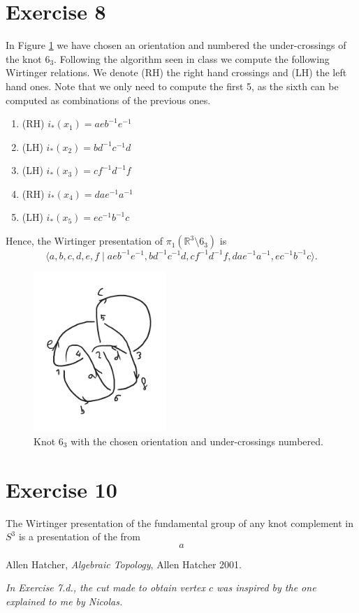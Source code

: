 \documentclass[11pt,a4paper]{article}
\newcommand{\R}{\mathbb R}
\begin{document}
\section*{Exercise 8}
In Figure \ref{fig:63} we have chosen an orientation and numbered the under-crossings of the knot $ 6_3 $. Following the algorithm seen in class we compute the following Wirtinger relations. We denote (RH) the right hand crossings and (LH) the left hand ones. Note that we only need to compute the first 5, as the sixth can be computed as combinations of the previous ones.
\renewcommand{\theenumi}{\arabic{enumi}} 
\begin{enumerate}
  \item (RH) $ i_*(x_1) = a e b^{-1} e^{-1} $
  \item (LH) $ i_*(x_2) = b d^{-1} c^{-1} d $
  \item (LH) $ i_*(x_3) = c f^{-1} d^{-1} f $
  \item (RH) $ i_*(x_4) = d a e^{-1} a^{-1} $
  \item (LH) $ i_*(x_5) = e c^{-1} b^{-1} c $
\end{enumerate}
Hence, the Wirtinger presentation of $ \pi_1 (\R^3 \setminus 6_3) $ is
$$
  \langle a, b, c, d, e, f \mid a e b^{-1} e^{-1}, b d^{-1} c^{-1} d, c f^{-1} d^{-1} f, d a e^{-1} a^{-1}, e c^{-1} b^{-1} c\rangle.
$$
\begin{figure}[h]
  \centering
  \includegraphics[width=5cm]{63.pdf}
  \caption{Knot $6_3$ with the chosen orientation and under-crossings numbered.}
  \label{fig:63}
\end{figure}

\section*{Exercise 10}
The Wirtinger presentation of the fundamental group of any knot complement in $ S^3$ is a presentation of the from
$$
  a
$$

\begin{thebibliography}{9}

  Allen Hatcher,
  \textit{Algebraic Topology},
  Allen Hatcher 2001.

  \textit{In Exercise 7.d., the cut made to obtain vertex $c$ was inspired by the one explained to me by Nicolas.}
  
\end{thebibliography}
\end{document}
